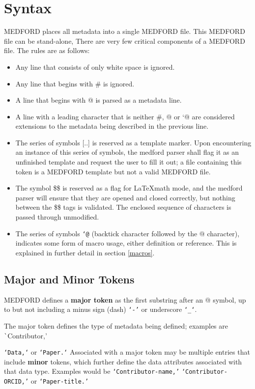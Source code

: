 \documentclass[10pt]{article}
\begin{document}
\section{Syntax} \label{syntax}{
MEDFORD places all metadata into a single MEDFORD file. This MEDFORD file can be stand-alone, 
    There are very few critical components of a MEDFORD file. The rules are as follows:
    \begin{itemize}
        \item Any line that consists of only white space is ignored.
        \item Any line that begins with \# is ignored.
        \item A line that begins with @ is parsed as a metadata line.
        \item A line with a leading character that is neither \#, @ or `@ are considered extensions to the metadata being described in the previous line.
        
        \item The series of symbols [..] is reserved as a template marker. Upon encountering an instance of this series of symbols, the medford parser shall flag it as an unfinished template and request the user to fill it out; a file containing this token is a MEDFORD template but not a valid MEDFORD file.
        \item The symbol \$\$ is reserved as a flag for \LaTeX math mode, and the medford parser will ensure that they are opened and closed correctly, but nothing between the \$\$ tags is validated. The enclosed sequence of characters is passed through unmodified.
        \item The series of symbols \texttt{`@} (backtick character followed by the @ character), indicates some form of macro usage, either definition or reference. This is explained in further detail in section \ref{macros}.
    \end{itemize}
    
    \subsection{Major and Minor Tokens}
    
    MEDFORD defines a \textbf{major token} as the first substring after an @ symbol, up to but not including a minus sign (dash) \texttt{`-'} or underscore \texttt{`\_`}.
    
    The major token defines the type of metadata being defined; examples are \texttt`Contributor,'} \texttt{`Data,`} or \texttt{`Paper.`} Associated with a major token may be multiple entries that include \textbf{minor} tokens, which further define the data attributes associated with that data type. Examples would be \texttt{`Contributor-name,'} \texttt{`Contributor-ORCID,'} or \texttt{`Paper-title.'}
    
\end{document}
